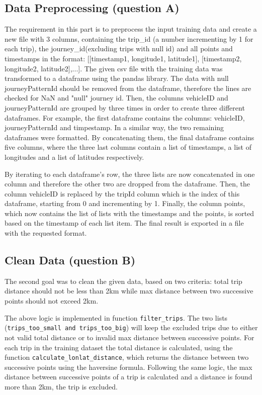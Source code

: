 \documentclass[12pt]{article}
\begin{document}
	\subsection{Data Preprocessing (question A)}
	The requirement in this part is to preprocess the input training data and create a new file with 3 columns, containing the trip\_id (a number incrementing by 1 for each trip), the journey\_id(excluding trips with null id) and all points and timestamps in the format: [[timestamp1, longitude1, latitude1], [timestamp2, longitude2, latitude2],...]. The given csv file with the training data was transformed to a dataframe using the pandas library. The data with null journeyPatternId should be removed from the dataframe, therefore the lines are checked for NaN and "null" journey id. Then, the columns vehicleID and journeyPatternId are grouped by three times in order to create three different dataframes. For example, the first dataframe contains the columns: vehicleID, journeyPatternId and timpestamp. In a similar way, the two remaining dataframes were formatted. By concatenating them, the final dataframe contains five columns, where the three last columns contain a list of timestamps, a list of longitudes and a list of latitudes respectively.
	
	By iterating to each dataframe's row, the three lists are now concatenated in one column and therefore the other two are dropped from the dataframe. Then, the column vehicleID is replaced by the tripId column which is the index of this dataframe, starting from 0 and incrementing by 1. Finally, the column points, which now contains the list of lists with the timestamps and the points, is sorted based on the timestamp of each list item. The final result is exported in a file with the requested format.
	
	\subsection{Clean Data (question B)}
	The second goal was to clean the given data, based on two criteria: total trip distance should not be less than 2km while max distance between two successive points should not exceed 2km.
	
	The above logic is implemented in function \texttt{filter\_trips}. The two lists (\texttt{trips\_too\_small and trips\_too\_big}) will keep the excluded trips due to either not valid total distance or to invalid max distance between successive points. For each trip in the training dataset the total distance is calculated, using the function \texttt{calculate\_lonlat\_distance}, which returns the distance between two successive points using the haversine formula. Following the same logic, the max distance between successive points of a trip is calculated and a distance is found more than 2km, the trip is excluded.
	
\end{document}
